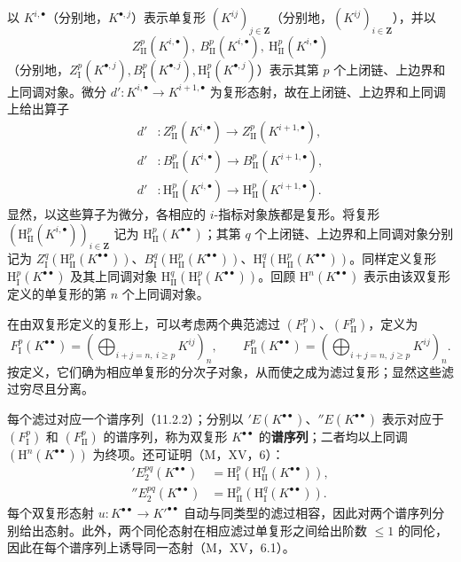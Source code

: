 以 $K^{i,\bullet}$（分别地，$K^{\bullet,j}$）表示单复形 $(K^{ij})_{j\in\mathbf Z}$（分别地，$(K^{ij})_{i\in\mathbf Z}$），并以
\[
Z_{\mathrm{II}}^p(K^{i,\bullet}),\ B_{\mathrm{II}}^p(K^{i,\bullet}),\ \mathrm H_{\mathrm{II}}^p(K^{i,\bullet})
\]
（分别地，$Z_{\mathrm I}^p(K^{\bullet,j}), B_{\mathrm I}^p(K^{\bullet,j}),\mathrm H_{\mathrm I}^p(K^{\bullet,j})$）表示其第 $p$ 个上闭链、上边界和上同调对象。微分 $d':K^{i,\bullet}\to K^{i+1,\bullet}$ 为复形态射，故在上闭链、上边界和上同调上给出算子
\[
\begin{aligned}
d'&:Z_{\mathrm{II}}^p(K^{i,\bullet})\to Z_{\mathrm{II}}^p(K^{i+1,\bullet}),\\
d'&:B_{\mathrm{II}}^p(K^{i,\bullet})\to B_{\mathrm{II}}^p(K^{i+1,\bullet}),\\
d'&:\mathrm H_{\mathrm{II}}^p(K^{i,\bullet})\to\mathrm H_{\mathrm{II}}^p(K^{i+1,\bullet}).
\end{aligned}
\]
显然，以这些算子为微分，各相应的 $i$-指标对象族都是复形。将复形 $(\mathrm H_{\mathrm{II}}^p(K^{i,\bullet}))_{i\in\mathbf Z}$ 记为 $\mathrm H_{\mathrm{II}}^p(K^{\bullet\bullet})$；其第 $q$ 个上闭链、上边界和上同调对象分别记为 $Z_{\mathrm I}^q(\mathrm H_{\mathrm{II}}^p(K^{\bullet\bullet}))$、$B_{\mathrm I}^q(\mathrm H_{\mathrm{II}}^p(K^{\bullet\bullet}))$、$\mathrm H_{\mathrm I}^q(\mathrm H_{\mathrm{II}}^p(K^{\bullet\bullet}))$。同样定义复形 $\mathrm H_{\mathrm I}^p(K^{\bullet\bullet})$ 及其上同调对象 $\mathrm H_{\mathrm{II}}^q(\mathrm H_{\mathrm I}^p(K^{\bullet\bullet}))$。回顾 $\mathrm H^n(K^{\bullet\bullet})$ 表示由该双复形定义的单复形的第 $n$ 个上同调对象。

在由双复形定义的复形上，可以考虑两个典范滤过 $(F_{\mathrm I}^p)$、$(F_{\mathrm{II}}^p)$，定义为
\begin{equation}\tag{11.3.2.1}
F_{\mathrm I}^p(K^{\bullet\bullet})=
\left(\bigoplus_{i+j=n,\ i\geq p}K^{ij}\right)_n,
\qquad
F_{\mathrm{II}}^p(K^{\bullet\bullet})=
\left(\bigoplus_{i+j=n,\ j\geq p}K^{ij}\right)_n.
\end{equation}
按定义，它们确为相应单复形的分次子对象，从而使之成为滤过复形；显然这些滤过穷尽且分离。

每个滤过对应一个谱序列（11.2.2）；分别以 $'E(K^{\bullet\bullet})$、$''E(K^{\bullet\bullet})$ 表示对应于 $(F_{\mathrm I}^p)$ 和 $(F_{\mathrm{II}}^p)$ 的谱序列，称为双复形 $K^{\bullet\bullet}$ 的\textbf{谱序列}；二者均以上同调 $(\mathrm H^n(K^{\bullet\bullet}))$ 为终项。还可证明（M，XV，6）：
\begin{equation}\tag{11.3.2.2}
\begin{aligned}
'E_2^{pq}(K^{\bullet\bullet})&=\mathrm H_{\mathrm I}^p(\mathrm H_{\mathrm{II}}^q(K^{\bullet\bullet})),\\
''E_2^{pq}(K^{\bullet\bullet})&=\mathrm H_{\mathrm{II}}^p(\mathrm H_{\mathrm I}^q(K^{\bullet\bullet})).
\end{aligned}
\end{equation}
每个双复形态射 $u:K^{\bullet\bullet}\to K'^{\bullet\bullet}$ 自动与同类型的滤过相容，因此对两个谱序列分别给出态射。此外，两个同伦态射在相应滤过单复形之间给出阶数 $\leq1$ 的同伦，因此在每个谱序列上诱导同一态射（M，XV，6.1）。

